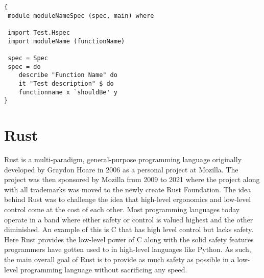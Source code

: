 \begin{lstlisting}[language=CSharp, caption={An example of a Hspec test}, label={lst:HspecTestExample}]
{
 module moduleNameSpec (spec, main) where

 import Test.Hspec
 import moduleName (functionName)

 spec = Spec
 spec = do
 	describe "Function Name" do
 	it "Test description" $ do
	functionname x `shouldBe' y
}
\end{lstlisting}

\section*{Rust}
Rust is a multi-paradigm, general-purpose programming language originally developed by Graydon Hoare in 2006 as a personal project at Mozilla.
The project was then sponsored by Mozilla from 2009 to 2021 where the project along with all trademarks was moved to the newly create Rust Foundation.
The idea behind Rust was to challenge the idea that high-level ergonomics and low-level control come at the cost of each other\cite{Rust_Book}. 
Most programming languages today operate in a band where either safety or control is valued highest and the other diminished. An example of this is C that has high level control but lacks safety.
Here Rust provides the low-level power of C along with the solid safety features programmers have gotten used to in high-level languages like Python.
As such, the main overall goal of Rust is to provide as much safety as possible in a low-level programming language without sacrificing any speed. \cite{Rust_in_Action}

